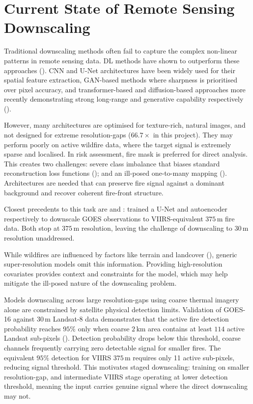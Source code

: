 \documentclass[a4paper, 11pt]{article} %
\begin{document}
\section{Current State of Remote Sensing Downscaling}
Traditional downscaling methods often fail to capture the complex non-linear patterns in remote sensing data. DL methods have shown to outperform these approaches (\cite{sdrakaDeepLearningDownscaling2022}). CNN and U-Net architectures have been widely used for their spatial feature extraction, GAN-based methods where sharpness is prioritised over pixel accuracy, and transformer-based and diffusion-based approaches more recently demonstrating strong long-range and generative capability respectively (\cite{wangVGGTVisualGeometry2025, wangSinSRDiffusionBasedImage2023}).

However, many architectures are optimised for texture-rich, natural images, and not designed for extreme resolution-gaps ($66.7\times$ in this project). They may perform poorly on active wildfire data, where the target signal is extremely sparse and localised. In risk assessment, fire mask is preferred for direct analysis. This creates two challenges: severe class imbalance that biases standard reconstruction loss functions (\cite{qiAdvancingImageSuperresolution2026}); and an ill-posed one-to-many mapping (\cite{wangDeepLearningImage2020}). Architectures are needed that can preserve fire signal against a dominant background and recover coherent fire-front structure.

Closest precedents to this task are \cite{mccarthyDeepLearningApproach2021} and \cite{badhanDeepLearningApproach2024}: trained a U-Net and autoencoder respectively to downscale GOES observations to VIIRS-equivalent $375\,\text{m}$ fire data. Both stop at $375\,\text{m}$ resolution, leaving the challenge of downscaling to $30\,\text{m}$ resolution unaddressed.

While wildfires are influenced by factors like terrain and landcover (\cite{sullivanInfernoFundamentalProcesses2017}), generic super-resolution models omit this information. Providing high-resolution covariates provides context and constraints for the model, which may help mitigate the ill-posed nature of the downscaling problem.

Models downscaling across large resolution-gaps using coarse thermal imagery alone are constrained by satellite physical detection limits. Validation of GOES-16 against $30\,\text{m}$ Landsat-8 data demonstrates that the active fire detection probability reaches $95\%$ only when coarse $2\,\text{km}$ area contains at least $114$ active Landsat sub-pixels (\cite{liPreliminaryEvaluationGOES162020}). Detection probability drops below this threshold, coarse channels frequently carrying zero detectable signal for smaller fires. The equivalent $95\%$ detection for VIIRS $375\,\text{m}$ requires only 11 active sub-pixels, reducing signal threshold. This motivates staged downscaling: training on smaller resolution-gap, and intermediate VIIRS stage operating at lower detection threshold, meaning the input carries genuine signal where the direct downscaling may not.
\end{document}
